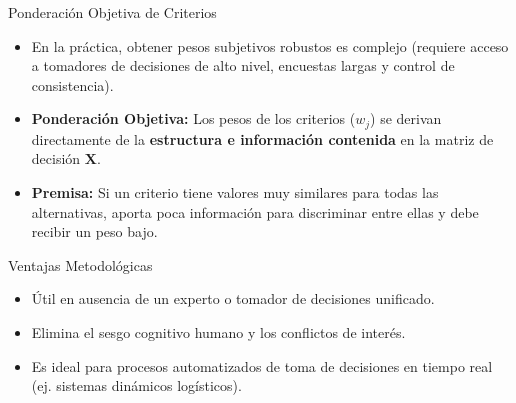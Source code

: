 \documentclass[aspectratio=169, 10pt]{beamer}
\begin{document}
\begin{frame}{Ponderación Objetiva de Criterios}
    \begin{itemize}
        \item En la práctica, obtener pesos subjetivos robustos es complejo (requiere acceso a tomadores de decisiones de alto nivel, encuestas largas y control de consistencia).
        \item \textbf{Ponderación Objetiva:} Los pesos de los criterios ($w_j$) se derivan directamente de la \textbf{estructura e información contenida} en la matriz de decisión $\mathbf{X}$.
        \item \textbf{Premisa:} Si un criterio tiene valores muy similares para todas las alternativas, aporta poca información para discriminar entre ellas y debe recibir un peso bajo.
    \end{itemize}
    \begin{exampleblock}{Ventajas Metodológicas}
        \scriptsize
        \begin{itemize}
            \item Útil en ausencia de un experto o tomador de decisiones unificado.
            \item Elimina el sesgo cognitivo humano y los conflictos de interés.
            \item Es ideal para procesos automatizados de toma de decisiones en tiempo real (ej. sistemas dinámicos logísticos).
        \end{itemize}
    \end{exampleblock}
\end{frame}
\end{document}
